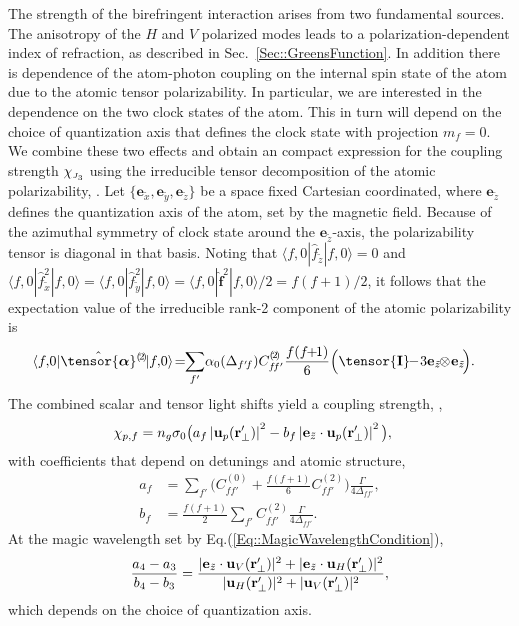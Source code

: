 \documentclass[aps,pra,twocolumn]{revtex4-1} %
\newcommand{\unittens}{\tensor{\mathbf{I}}}
\newcommand{\poltens}{\hat{\tensor{\boldsymbol{\alpha}}}}
\newcommand{\charpol}{\alpha_0(\Delta_{f'\!f})}
\newcommand{\qaxis}{\mathbf{e}_{\tilde{z}}}
\newcommand{\chieff}{\chi_{\raisebox{-.1pt}{\tiny $J_3$}}}
\begin{document}
The strength of the birefringent interaction {\color{blue} arises from two fundamental sources.  The anisotropy of the   $H$ and $V$ polarized modes leads to a polarization-dependent index of refraction, as described in Sec.~\ref{Sec::GreensFunction}.  In addition there is dependence of the atom-photon coupling on the internal spin state of the atom due to the atomic tensor polarizability.  In particular, we are interested in the dependence on the two clock states of the atom.  This in turn will depend on the choice of quantization axis that defines the clock state with projection $m_f=0$. } We combine these two effects and obtain an compact expression for the coupling strength $\chieff$ using the irreducible tensor decomposition of the atomic polarizability, .  
Let {\color{blue} $\{\mathbf{e}_{\tilde{x}},\mathbf{e}_{\tilde{y}}, \mathbf{e}_{\tilde{z}}\}$ be a space fixed Cartesian coordinated, where $\mathbf{e}_{\tilde{z}}$ defines the quantization axis of the atom, set by the magnetic field}.  Because of the azimuthal symmetry of clock state around the $\qaxis$-axis, the polarizability tensor is diagonal in that basis.  
Noting that $\langle f,0 | \hat{f}_{\tilde{z}}| f,0 \rangle =0$ and $\langle f,0 | \hat{f}_{\tilde{x}}^2| f,0 \rangle = \langle f,0 | \hat{f}_{\tilde{y}}^2| f,0 \rangle = \langle f,0 | \hat{\mathbf{f}}^2| f,0 \rangle /2 =f(f+1)/2$, it follows that the expectation value of the irreducible rank-2 component of the atomic polarizability is
	\begin{align} \label{Eq::CouplingAngleMagic}
		\!\!\!\!\!\langle f,\! 0 | \poltens \phantom{}^{(\!2\!)}\!| f,\!0 \rangle \!=\!\! \sum_{f'}\! \charpol C^{(\!2\!)}_{f\!f'} \frac{f(f\!\!+\!\!1)}{6} \Big( \unittens \!\!-\! 3\qaxis \!\!\otimes\! \qaxis\! \Big).
	\end{align}
The combined scalar and tensor light shifts yield a coupling strength, ,
	\begin{align}
		\chi_{p,f} &  = n_g \sigma_0 \big(  a_{f} \left|\mathbf{u}_p(\mathbf{r}'_\perp)\right|^2 - b_{f} \left|\mathbf{e}_{\tilde{z}} \cdot \mathbf{u}_p(\mathbf{r}'_\perp)\right|^2 \big), \label{Eq::ClockStateCoupling}
	\end{align}
with coefficients that depend on detunings and atomic structure,
	\begin{align}
		a_f &= \sum_{f'}  \Big(C^{(0)}_{ff'} + \frac{f(f+1)}{6} C^{(2)}_{ff'} \Big) \frac{\Gamma}{4 \Delta_{ff'}},\\
		b_f &= \frac{f(f+1)}{2}\sum_{f'} C^{(2)}_{ff'}  \frac{\Gamma}{4 \Delta_{ff'}}.
	\end{align}
At the magic wavelength set by Eq.(\ref{Eq::MagicWavelengthCondition}),
\begin{equation}
	\frac{a_4-a_3}{b_4-b_3} =  \frac{ |\mathbf{e}_{\tilde{z}} \cdot \mathbf{u}_V(\mathbf{r}'_\perp)|^2  + |\mathbf{e}_{\tilde{z}} \cdot \mathbf{u}_H(\mathbf{r}'_\perp) |^2 }{ |\mathbf{u}_H(\mathbf{r}'_\perp)|^2 + |\mathbf{u}_V(\mathbf{r}'_\perp)|^2 },
\end{equation}
which depends on the choice of quantization axis.
\end{document}
